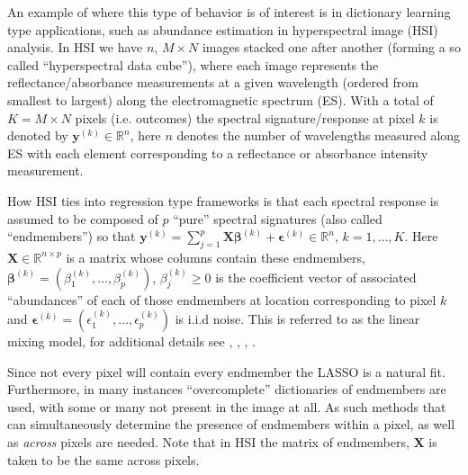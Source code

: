 \documentclass{article}
\numberwithin{equation}{section}
\theoremstyle{plain}
\newcommand{\bs}{\boldsymbol}
\begin{document}
An example of where this type of behavior is of interest is in dictionary
learning type applications, such as abundance estimation in hyperspectral image
(HSI) analysis.
In HSI we have $n$, $M \times N$ images stacked one after another (forming a so
called ``hyperspectral data cube''), where each image represents the
reflectance/absorbance measurements at a given wavelength (ordered from smallest
to largest) along the electromagnetic spectrum (ES). With a total of $K = M
\times N$ pixels (i.e. outcomes) the spectral signature/response at pixel $k$ is
denoted by $\mathbf{y}^{(k)} \in \mathbb{R}^n$, here $n$ denotes the number of
wavelengths measured along ES with each element corresponding to a reflectance
or absorbance intensity measurement.

How HSI ties into regression type frameworks is that each spectral response is
assumed to be composed of $p$ ``pure'' spectral signatures (also called
``endmembers'') so that $\mathbf{y}^{(k)} = \sum_{j=1}^p \mathbf{X}
\bs\beta^{(k)} + \bs\epsilon^{(k)} \in \mathbb{R}^n$, $k = 1,\ldots,K$. Here
$\mathbf{X} \in \mathbb{R}^{n \times p}$ is a matrix whose columns contain these
endmembers, $\bs\beta^{(k)} = (\beta_1^{(k)}, \ldots, \beta_p^{(k)})$,
$\beta_j^{(k)} \geq 0$ is the coefficient vector of associated ``abundances'' of
each of those endmembers at location corresponding to pixel $k$ and
$\bs\epsilon^{(k)} = (\epsilon_1^{(k)}, \ldots, \epsilon_p^{(k)})$ is i.i.d
noise.
This is referred to as the linear mixing model, for additional details see
\cite{dias2011}, \cite{clarke2011}, \cite{clarke2012}, \cite{samarov2012boe}.
 

Since not every pixel will contain every endmember the LASSO is a natural fit.
Furthermore, in many instances ``overcomplete'' dictionaries of endmembers are
used, with some or many not present in the image at all. As such methods that
can simultaneously determine the presence of endmembers within a pixel, as well
as {\it across} pixels are needed. Note that in HSI the matrix of endmembers,
$\mathbf{X}$ is taken to be the same across pixels.
\end{document}
